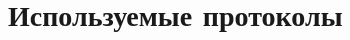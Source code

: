 \documentclass[12pt,a4paper]{report}
\makeatletter
\def\imod#1{\allowbreak\,({\operator@font mod}\ #1)}
\def \jacobi #1#2{\left(\frac{#1}{#2}\right)}
\makeatother
\begin{document}




\chapter{Используемые протоколы}
\end{document}
